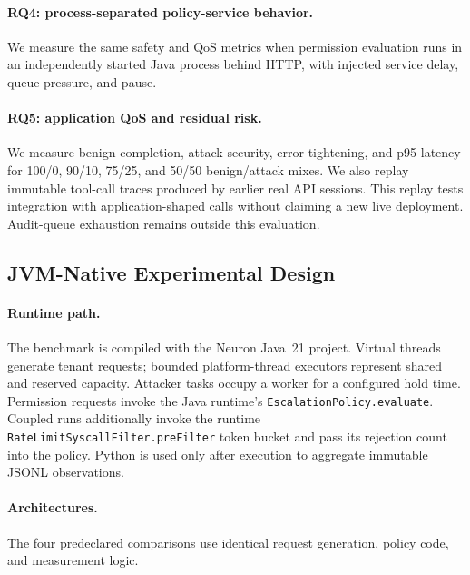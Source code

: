 \paragraph{RQ4: process-separated policy-service behavior.}
We measure the same safety and QoS metrics when permission evaluation runs in
an independently started Java process behind HTTP, with injected service
delay, queue pressure, and pause.

\paragraph{RQ5: application QoS and residual risk.}
We measure benign completion, attack security, error tightening, and p95
latency for 100/0, 90/10, 75/25, and 50/50 benign/attack mixes. We also replay
immutable tool-call traces produced by earlier real API sessions. This replay
tests integration with application-shaped calls without claiming a new live
deployment. Audit-queue exhaustion remains outside this evaluation.

\subsection{JVM-Native Experimental Design}
\label{sec:eval-starvation}

\paragraph{Runtime path.}
The benchmark is compiled with the Neuron Java~21 project. Virtual threads
generate tenant requests; bounded platform-thread executors represent shared
and reserved capacity. Attacker tasks occupy a worker for a configured hold
time. Permission requests invoke the Java runtime's
\texttt{EscalationPolicy.evaluate}. Coupled runs additionally invoke the
runtime \texttt{RateLimitSyscallFilter.preFilter} token bucket and pass
its rejection count into the policy. Python is used only after execution to
aggregate immutable JSONL observations.

\paragraph{Architectures.}
The four predeclared comparisons use identical request generation, policy
code, and measurement logic.


